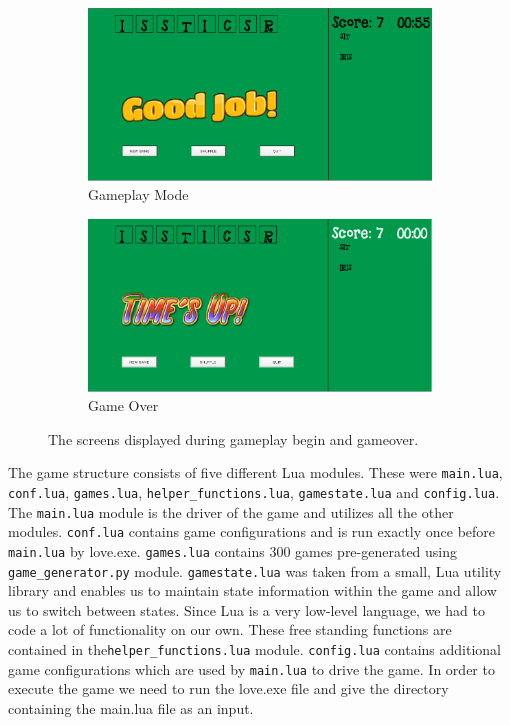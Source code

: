\begin{figure}
    \centering
    \begin{subfigure}{0.49\textwidth}
        \includegraphics[width=\textwidth]{../screenshots/luagameplay.png}
        \caption{Gameplay Mode}
        \label{luagameplay}
    \end{subfigure}
    \begin{subfigure}{0.49\textwidth}
        \includegraphics[width=\textwidth]{../screenshots/luagameover.png}
        \caption{Game Over}
        \label{luagameover}
    \end{subfigure}
    \caption{The screens displayed during gameplay begin and gameover.}
    \label{luascreenshots2}
\end{figure}

	The game structure consists of five different Lua modules. These were \texttt{main.lua}, \texttt{conf.lua}, \texttt{games.lua},  \texttt{helper\_functions.lua}, \texttt{gamestate.lua} and \texttt{config.lua}. 
	The \texttt{main.lua} module is the driver of the game and utilizes all the other modules. \texttt{conf.lua} contains game configurations and is run exactly once before \texttt{main.lua} by love.exe. \texttt{games.lua} contains 300 games pre-generated using \texttt{game\_generator.py} module. \texttt{gamestate.lua} was taken from  a small, Lua utility library and enables us to maintain state information within the game and allow us to switch between states. Since Lua is a very low-level language, we had to code a lot of functionality on our own. These free standing functions are contained in the\texttt{helper\_functions.lua} module. \texttt{config.lua} contains additional game configurations which are used by \texttt{main.lua} to drive the game. In order to execute the game we need to run the love.exe file and give the directory containing the main.lua file as an input.
